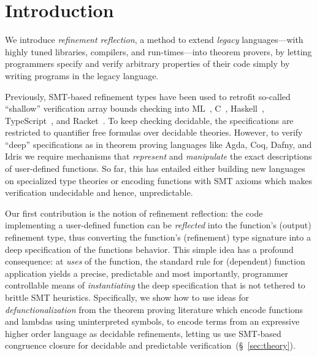 \section{Introduction}\label{sec:intro}

We introduce \emph{refinement reflection}, a method
to extend \emph{legacy} languages---with highly tuned
libraries, compilers, and run-times---into theorem provers,
by letting programmers specify and verify
arbitrary properties of their code simply
by writing programs in the legacy language.

Previously, SMT-based refinement types
\citep{ConstableS87,Rushby98} have been
used to retrofit so-called ``shallow''
verification \eg array bounds checking into
%
ML~\cite{pfenningxi98,GordonRefinement09,LiquidPLDI08},
%
C~\cite{deputy,LiquidPOPL10},
%
Haskell~\citep{Vazou14},
%
TypeScript~\cite{Vekris16}, and
%
Racket~\cite{RefinedRacket}.
%
%
To keep checking decidable, the specifications
are restricted to quantifier free formulas over
decidable theories.
%
However, to verify ``deep'' specifications as
in theorem proving languages like Agda, Coq, Dafny,
\fstar and Idris we require mechanisms that
\emph{represent} and \emph{manipulate} the
exact descriptions of user-defined functions.
%
So far, this has entailed either building new
languages on specialized type theories or
encoding functions with SMT axioms which makes
verification undecidable and hence, unpredictable.

%
%
Our first contribution is the notion of
refinement reflection: the code
implementing a​ user-defined function can
be \emph{reflected}​ into the function's
(output) refinement type, thus converting
the function's (refinement) type signature
into a deep specification of the functions
behavior.
%
This simple idea has a profound consequence:
at \emph{uses} of the function, the standard
rule for (dependent) function application
yields a precise, predictable and most
importantly, programmer controllable
means of \emph{instantiating} the deep
specification that is not tethered to
brittle SMT heuristics.
%
Specifically, we show how to use ideas for
\emph{defunctionalization} from the theorem
proving literature which encode functions
and lambdas using uninterpreted symbols,
to encode terms from an expressive higher
order language as decidable refinements,
letting us use SMT-based congruence
closure for decidable and predictable
verification~(\S~\ref{sec:theory}).

